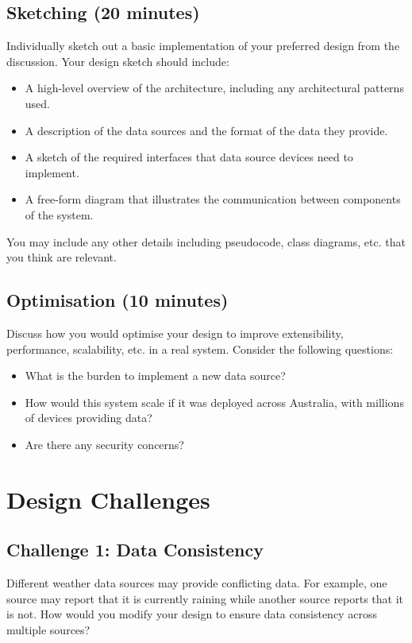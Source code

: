\documentclass{csse4400}
\begin{document}
\subsection*{Sketching (20 minutes)}
Individually sketch out a basic implementation of your preferred design from the discussion.
Your design sketch should include:
\begin{itemize}
\item A high-level overview of the architecture, including any architectural patterns used.
\item A description of the data sources and the format of the data they provide.
\item A sketch of the required interfaces that data source devices need to implement.
\item A free-form diagram that illustrates the communication between components of the system.
\end{itemize}
You may include any other details including pseudocode, class diagrams, etc. that you think are relevant.

\subsection*{Optimisation (10 minutes)}
Discuss how you would optimise your design to improve extensibility, performance, scalability, etc. in a real system.
Consider the following questions:
\begin{itemize}
\item What is the burden to implement a new data source?
\item How would this system scale if it was deployed across Australia, with millions of devices providing data?
\item Are there any security concerns?
\end{itemize}

\section{Design Challenges}

\subsection*{Challenge 1: Data Consistency}
Different weather data sources may provide conflicting data.
For example, one source may report that it is currently raining while another source reports that it is not.
How would you modify your design to ensure data consistency across multiple sources?
\end{document}
